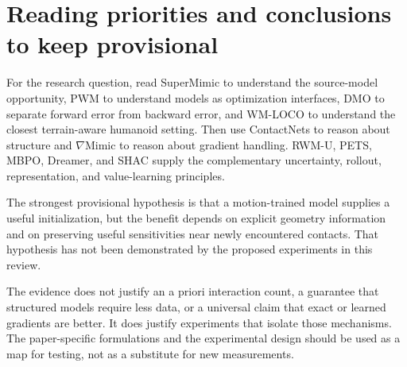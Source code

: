 \section{Reading priorities and conclusions to keep provisional}
For the research question, read SuperMimic to understand the source-model
opportunity, PWM to understand models as optimization interfaces, DMO to
separate forward error from backward error, and WM-LOCO to understand the closest
terrain-aware humanoid setting. Then use ContactNets to reason about structure
and $\nabla$Mimic to reason about gradient handling. RWM-U, PETS, MBPO, Dreamer,
and SHAC supply the complementary uncertainty, rollout, representation, and
value-learning principles.

The strongest provisional hypothesis is that a motion-trained model supplies a
useful initialization, but the benefit depends on explicit geometry information
and on preserving useful sensitivities near newly encountered contacts. That
hypothesis has not been demonstrated by the proposed experiments in this review.

The evidence does not justify an a priori interaction count, a guarantee that
structured models require less data, or a universal claim that exact or learned
gradients are better. It does justify experiments that isolate those mechanisms.
The paper-specific formulations and the experimental design should be used as a
map for testing, not as a substitute for new measurements.

\appendix
